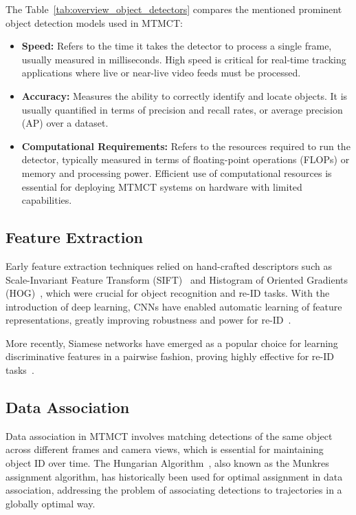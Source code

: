 The Table~\ref{tab:overview_object_detectors} compares the mentioned prominent object detection models used in MTMCT:

\begin{itemize}
    \item \textbf{Speed:} Refers to the time it takes the detector to process a single frame, usually measured in milliseconds. High speed is critical for real-time tracking applications where live or near-live video feeds must be processed.
    \item \textbf{Accuracy:} Measures the ability to correctly identify and locate objects. It is usually quantified in terms of precision and recall rates, or average precision (AP) over a dataset.
    \item \textbf{Computational Requirements:} Refers to the resources required to run the detector, typically measured in terms of floating-point operations (FLOPs) or memory and processing power. Efficient use of computational resources is essential for deploying MTMCT systems on hardware with limited capabilities.
\end{itemize}

\subsection{Feature Extraction}\label{subsec:milestone:eature_extraction}
Early feature extraction techniques relied on hand-crafted descriptors such as Scale-Invariant Feature Transform (SIFT)~\cite{Lowe04} and Histogram of Oriented Gradients (HOG)~\cite{Dalal05}, which were crucial for object recognition and re-ID tasks. With the introduction of deep learning, CNNs have enabled automatic learning of feature representations, greatly improving robustness and power for re-ID~\cite{Krizhevsky12, He16}.

More recently, Siamese networks have emerged as a popular choice for learning discriminative features in a pairwise fashion, proving highly effective for re-ID tasks~\cite{Varior16}.

\subsection{Data Association}\label{subsec:milestone_data_association}
Data association in MTMCT involves matching detections of the same object across different frames and camera views, which is essential for maintaining object ID over time. The Hungarian Algorithm~\cite{Kuhn55}, also known as the Munkres assignment algorithm, has historically been used for optimal assignment in data association, addressing the problem of associating detections to trajectories in a globally optimal way.

